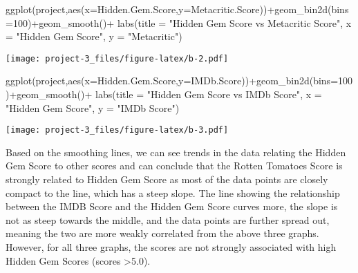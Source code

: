 \documentclass[
]{article}
\newenvironment{Shaded}{\begin{snugshade}}{\end{snugshade}}
\newcommand{\AttributeTok}[1]{\textcolor[rgb]{0.77,0.63,0.00}{#1}}
\newcommand{\DecValTok}[1]{\textcolor[rgb]{0.00,0.00,0.81}{#1}}
\newcommand{\FunctionTok}[1]{\textcolor[rgb]{0.00,0.00,0.00}{#1}}
\newcommand{\NormalTok}[1]{#1}
\newcommand{\SpecialCharTok}[1]{\textcolor[rgb]{0.00,0.00,0.00}{#1}}
\newcommand{\StringTok}[1]{\textcolor[rgb]{0.31,0.60,0.02}{#1}}
\begin{document}
\begin{Shaded}
\begin{Highlighting}[]
\FunctionTok{ggplot}\NormalTok{(project,}\FunctionTok{aes}\NormalTok{(}\AttributeTok{x=}\NormalTok{Hidden.Gem.Score,}\AttributeTok{y=}\NormalTok{Metacritic.Score))}\SpecialCharTok{+}\FunctionTok{geom\_bin2d}\NormalTok{(}\AttributeTok{bins=}\DecValTok{100}\NormalTok{)}\SpecialCharTok{+}\FunctionTok{geom\_smooth}\NormalTok{()}\SpecialCharTok{+} \FunctionTok{labs}\NormalTok{(}\AttributeTok{title =} \StringTok{"Hidden Gem Score vs Metacritic Score"}\NormalTok{, }\AttributeTok{x =} \StringTok{"Hidden Gem Score"}\NormalTok{, }\AttributeTok{y =} \StringTok{"Metacritic"}\NormalTok{)}
\end{Highlighting}
\end{Shaded}

\texttt{[image: project-3\_files/figure-latex/b-2.pdf]}

\begin{Shaded}
\begin{Highlighting}[]
\FunctionTok{ggplot}\NormalTok{(project,}\FunctionTok{aes}\NormalTok{(}\AttributeTok{x=}\NormalTok{Hidden.Gem.Score,}\AttributeTok{y=}\NormalTok{IMDb.Score))}\SpecialCharTok{+}\FunctionTok{geom\_bin2d}\NormalTok{(}\AttributeTok{bins=}\DecValTok{100}\NormalTok{)}\SpecialCharTok{+}\FunctionTok{geom\_smooth}\NormalTok{()}\SpecialCharTok{+} \FunctionTok{labs}\NormalTok{(}\AttributeTok{title =} \StringTok{"Hidden Gem Score vs IMDb Score"}\NormalTok{, }\AttributeTok{x =} \StringTok{"Hidden Gem Score"}\NormalTok{, }\AttributeTok{y =} \StringTok{"IMDb Score"}\NormalTok{)}
\end{Highlighting}
\end{Shaded}

\texttt{[image: project-3\_files/figure-latex/b-3.pdf]}

Based on the smoothing lines, we can see trends in the data relating the
Hidden Gem Score to other scores and can conclude that the Rotten
Tomatoes Score is strongly related to Hidden Gem Score as most of the
data points are closely compact to the line, which has a steep slope.
The line showing the relationship between the IMDB Score and the Hidden
Gem Score curves more, the slope is not as steep towards the middle, and
the data points are further spread out, meaning the two are more weakly
correlated from the above three graphs. However, for all three graphs,
the scores are not strongly associated with high Hidden Gem Scores
(scores \textgreater5.0).

\newpage
\end{document}
